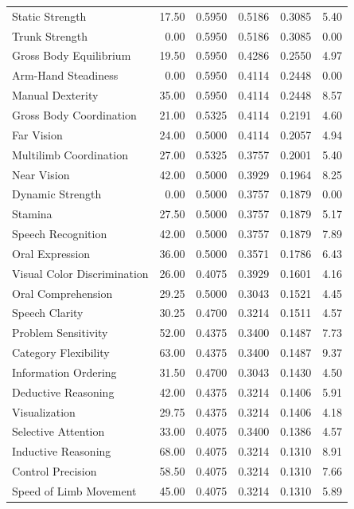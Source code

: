\begin{longtable}{lrrrrr}
  Static Strength & 17.50 & 0.5950 & 0.5186 & 0.3085 & 5.40 \\
  Trunk Strength & 0.00 & 0.5950 & 0.5186 & 0.3085 & 0.00 \\
  Gross Body Equilibrium & 19.50 & 0.5950 & 0.4286 & 0.2550 & 4.97 \\
  Arm-Hand Steadiness & 0.00 & 0.5950 & 0.4114 & 0.2448 & 0.00 \\
  Manual Dexterity & 35.00 & 0.5950 & 0.4114 & 0.2448 & 8.57 \\
  Gross Body Coordination & 21.00 & 0.5325 & 0.4114 & 0.2191 & 4.60 \\
  Far Vision & 24.00 & 0.5000 & 0.4114 & 0.2057 & 4.94 \\
  Multilimb Coordination & 27.00 & 0.5325 & 0.3757 & 0.2001 & 5.40 \\
  Near Vision & 42.00 & 0.5000 & 0.3929 & 0.1964 & 8.25 \\
  Dynamic Strength & 0.00 & 0.5000 & 0.3757 & 0.1879 & 0.00 \\
  Stamina & 27.50 & 0.5000 & 0.3757 & 0.1879 & 5.17 \\
  Speech Recognition & 42.00 & 0.5000 & 0.3757 & 0.1879 & 7.89 \\
  Oral Expression & 36.00 & 0.5000 & 0.3571 & 0.1786 & 6.43 \\
  Visual Color Discrimination & 26.00 & 0.4075 & 0.3929 & 0.1601 & 4.16 \\
  Oral Comprehension & 29.25 & 0.5000 & 0.3043 & 0.1521 & 4.45 \\
  Speech Clarity & 30.25 & 0.4700 & 0.3214 & 0.1511 & 4.57 \\
  Problem Sensitivity & 52.00 & 0.4375 & 0.3400 & 0.1487 & 7.73 \\
  Category Flexibility & 63.00 & 0.4375 & 0.3400 & 0.1487 & 9.37 \\
  Information Ordering & 31.50 & 0.4700 & 0.3043 & 0.1430 & 4.50 \\
  Deductive Reasoning & 42.00 & 0.4375 & 0.3214 & 0.1406 & 5.91 \\
  Visualization & 29.75 & 0.4375 & 0.3214 & 0.1406 & 4.18 \\
  Selective Attention & 33.00 & 0.4075 & 0.3400 & 0.1386 & 4.57 \\
  Inductive Reasoning & 68.00 & 0.4075 & 0.3214 & 0.1310 & 8.91 \\
  Control Precision & 58.50 & 0.4075 & 0.3214 & 0.1310 & 7.66 \\
  Speed of Limb Movement & 45.00 & 0.4075 & 0.3214 & 0.1310 & 5.89 \\

\end{longtable}
